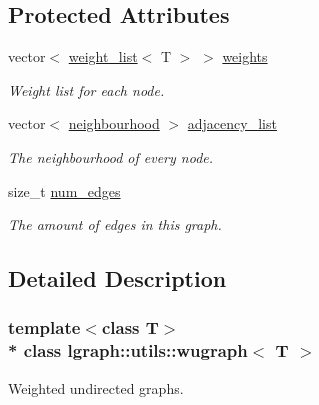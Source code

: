 \subsection*{Protected Attributes}
\begin{DoxyCompactItemize}
\item 
vector$<$ \hyperlink{namespacelgraph_1_1utils_a11e7963f3637ea13778b8d3e69d2c17f}{weight\+\_\+list}$<$ T $>$ $>$ \hyperlink{classlgraph_1_1utils_1_1wxgraph_a15569c8c0fccb641709dc81eb0e29c94}{weights}
\begin{DoxyCompactList}\small\item\em Weight list for each node. \end{DoxyCompactList}\item 
vector$<$ \hyperlink{namespacelgraph_1_1utils_a0f2ef47028a466d26841709e705390ac}{neighbourhood} $>$ \hyperlink{classlgraph_1_1utils_1_1xxgraph_a1d5fda0d5aa89340f997428b982f966f}{adjacency\+\_\+list}\hypertarget{classlgraph_1_1utils_1_1xxgraph_a1d5fda0d5aa89340f997428b982f966f}{}\label{classlgraph_1_1utils_1_1xxgraph_a1d5fda0d5aa89340f997428b982f966f}

\begin{DoxyCompactList}\small\item\em The neighbourhood of every node. \end{DoxyCompactList}\item 
size\+\_\+t \hyperlink{classlgraph_1_1utils_1_1xxgraph_a217ebb1cd8946fedfbf94a9b22f7da48}{num\+\_\+edges}\hypertarget{classlgraph_1_1utils_1_1xxgraph_a217ebb1cd8946fedfbf94a9b22f7da48}{}\label{classlgraph_1_1utils_1_1xxgraph_a217ebb1cd8946fedfbf94a9b22f7da48}

\begin{DoxyCompactList}\small\item\em The amount of edges in this graph. \end{DoxyCompactList}\end{DoxyCompactItemize}


\subsection{Detailed Description}
\subsubsection*{template$<$class T$>$\\*
class lgraph\+::utils\+::wugraph$<$ T $>$}

Weighted undirected graphs. 

